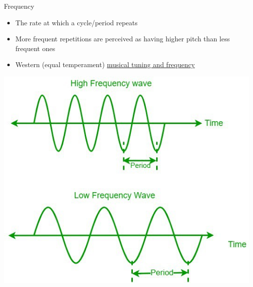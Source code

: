 \documentclass[professionalfonts]{beamer}
\begin{document}
\begin{frame}{Frequency}
    \begin{multicols}{2}
        \begin{itemize}
            \item The rate at which a cycle/period repeats
            \item More frequent repetitions are perceived as having higher pitch than less frequent ones
            \item Western (equal temperament) \href{https://mixbutton.com/music-tools/frequency-and-pitch/music-note-to-frequency-chart}{musical tuning and frequency}
        \end{itemize}

        \columnbreak

        \begin{center}
            \includegraphics[width = \linewidth]{figs/Frequency.png}
        \end{center}
    \end{multicols}
\end{frame}
\end{document}
